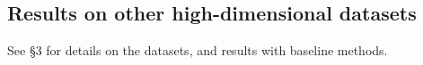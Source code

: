 \documentclass[11pt,onecolumn]{article}
\begin{document}

\subsection{Results on other high-dimensional datasets}

See \S3 for details on the datasets, and results with baseline methods.
\end{document}
